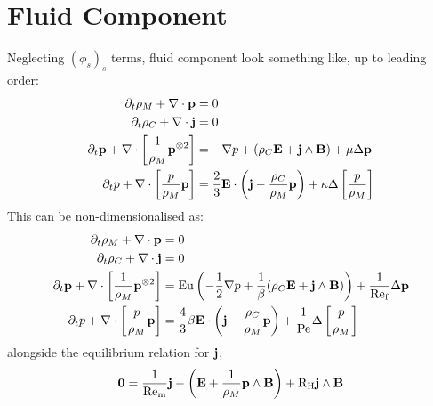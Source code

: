 \chapter{Fluid Component}

    Neglecting $(\phi_{s})_{s}$ terms, fluid component look something like, up to leading order: 
    \begin{align}
        \partial_{t}\rho_{M} + \nabla\cdot\mathbf{p}  &=  0  \\
        \partial_{t}\rho_{C} + \nabla\cdot\mathbf{j}  &=  0  \\
        \partial_{t}\mathbf{p} + \nabla\cdot\left[\frac{1}{\rho_{M}}\mathbf{p}^{\otimes 2}\right]  &=  - \nabla p + (\rho_{C}\mathbf{E} + \mathbf{j}\wedge\mathbf{B}) + \mu\Delta\mathbf{p}  \\
        \partial_{t}p + \nabla\cdot\left[\frac{p}{\rho_{M}}\mathbf{p}\right]  &=  \frac{2}{3}\mathbf{E}\cdot\left(\mathbf{j} - \frac{\rho_{C}}{\rho_{M}}\mathbf{p}\right) + \kappa\Delta\left[\frac{p}{\rho_{M}}\right]
    \end{align}
    This can be non-dimensionalised  as:
    \begin{align}
        \partial_{t}\rho_{M} + \nabla\cdot\mathbf{p}  &=  0  \\
        \partial_{t}\rho_{C} + \nabla\cdot\mathbf{j}  &=  0  \\
        \partial_{t}\mathbf{p} + \nabla\cdot\left[\frac{1}{\rho_{M}}\mathbf{p}^{\otimes 2}\right]  &=  \mathrm{Eu}\left(- \frac{1}{2}\nabla p + \frac{1}{\beta}(\rho_{C}\mathbf{E} + \mathbf{j}\wedge\mathbf{B})\right) + \frac{1}{\mathrm{Re}_{\mathrm{f}}}\Delta\mathbf{p}  \\
        \partial_{t}p + \nabla\cdot\left[\frac{p}{\rho_{M}}\mathbf{p}\right]  &=  \frac{4}{3}\beta\mathbf{E}\cdot\left(\mathbf{j} - \frac{\rho_{C}}{\rho_{M}}\mathbf{p}\right) + \frac{1}{\mathrm{Pe}}\Delta\left[\frac{p}{\rho_{M}}\right]
    \end{align}
    alongside the equilibrium relation for $\mathbf{j}$,
    \begin{equation}\label{eqn:current identity}
        \mathbf{0}  =  \frac{1}{\mathrm{Re}_{\mathrm{m}}}\mathbf{j} - \left(\mathbf{E} + \frac{1}{\rho_{M}}\mathbf{p}\wedge\mathbf{B}\right) + \mathrm{R}_{\mathrm{H}}\mathbf{j}\wedge\mathbf{B}
    \end{equation}
